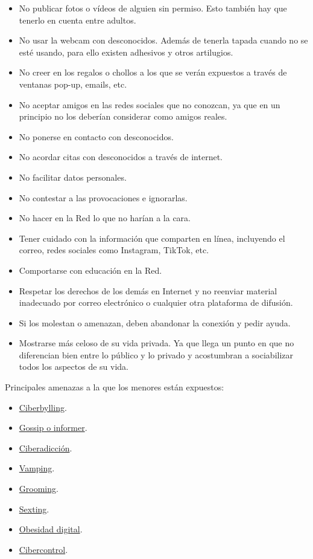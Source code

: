 \documentclass[
  a4paper,
  openany]{book}
\begin{document}
\begin{itemize}
\item
  No publicar fotos o vídeos de alguien sin permiso. Esto también hay que tenerlo en cuenta entre adultos.
\item
  No usar la webcam con desconocidos. Además de tenerla tapada cuando no se esté usando, para ello existen adhesivos y otros artilugios.
\item
  No creer en los regalos o chollos a los que se verán expuestos a través de ventanas pop-up, emails, etc.
\item
  No aceptar amigos en las redes sociales que no conozcan, ya que en un principio no los deberían considerar como amigos reales.
\item
  No ponerse en contacto con desconocidos.
\item
  No acordar citas con desconocidos a través de internet.
\item
  No facilitar datos personales.
\item
  No contestar a las provocaciones e ignorarlas.
\item
  No hacer en la Red lo que no harían a la cara.
\item
  Tener cuidado con la información que comparten en línea, incluyendo el correo, redes sociales como Instagram, TikTok, etc.
\item
  Comportarse con educación en la Red.
\item
  Respetar los derechos de los demás en Internet y no reenviar material inadecuado por correo electrónico o cualquier otra plataforma de difusión.
\item
  Si los molestan o amenazan, deben abandonar la conexión y pedir ayuda.
\item
  Mostrarse más celoso de su vida privada. Ya que llega un punto en que no diferencian bien entre lo público y lo privado y acostumbran a sociabilizar todos los aspectos de su vida.
\end{itemize}

Principales amenazas a la que los menores están expuestos:

\begin{itemize}
\item
  \href{https://ayudaenaccion.org/ong/blog/educacion/ciberbullying/}{Ciberbylling}.
\item
  \href{https://educacion2.com/que-es-el-fenomeno-gossip-e-informer/}{Gossip o informer}.
\item
  \href{https://www.aepap.org/sites/default/files/pags._131-142_ciberadicciones.pdf}{Ciberadicción}.
\item
  \href{https://www.educapeques.com/escuela-de-padres/vamping-definicion.html}{Vamping}.
\item
  \href{https://www.is4k.es/necesitas-saber/grooming}{Grooming}.
\item
  \href{https://www.is4k.es/menores-y-sexting}{Sexting}.
\item
  \href{https://www.levantalacabeza.es/obesidad-digital/}{Obesidad digital}.
\item
  \href{https://www.incibe.es/menores/tematicas/cibercontrol}{Cibercontrol}.
\end{itemize}
\end{document}
